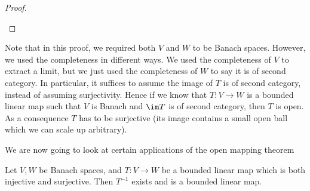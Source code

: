 \documentclass[a4paper]{article}
\begin{document}
\begin{proof}
\begin{enumerate}
%
  \end{enumerate}
\end{proof}
Note that in this proof, we required both $V$ and $W$ to be Banach spaces. However, we used the completeness in different ways. We used the completeness of $V$ to extract a limit, but we just used the completeness of $W$ to say it is of second category. In particular, it suffices to assume the image of $T$ is of second category, instead of assuming surjectivity. Hence if we know that $T: V\to W$ is a bounded linear map such that $V$ is Banach and $\im T$ is of second category, then $T$ is open. As a consequence $T$ has to be surjective (its image contains a small open ball which we can scale up arbitrary).

We are now going to look at certain applications of the open mapping theorem
\begin{thm}
  Let $V, W$ be Banach spaces, and $T: V\to W$ be a bounded linear map which is both injective and surjective. Then $T^{-1}$ exists and is a bounded linear map.
\end{thm}
\end{document}
